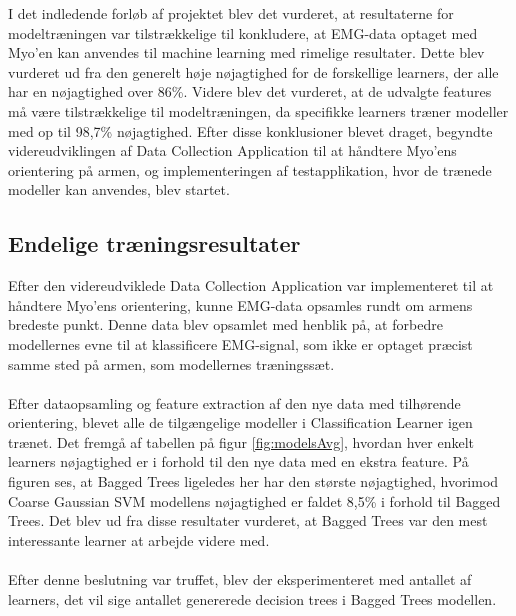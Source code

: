  I det indledende forløb af projektet blev det vurderet, at resultaterne for modeltræningen var tilstrækkelige til konkludere, at EMG-data optaget med Myo'en kan anvendes til machine learning med rimelige resultater. Dette blev vurderet ud fra den generelt høje nøjagtighed for de forskellige learners, der alle har en nøjagtighed over 86\%. Videre blev det vurderet, at de udvalgte features må være tilstrækkelige til modeltræningen, da specifikke learners træner modeller med op til 98,7\% nøjagtighed. Efter disse konklusioner blevet draget, begyndte videreudviklingen af Data Collection Application til at håndtere Myo'ens orientering på armen, og implementeringen af testapplikation, hvor de trænede modeller kan anvendes, blev startet.

 \subsection{Endelige træningsresultater}
 Efter den videreudviklede Data Collection Application var implementeret til at håndtere Myo'ens orientering, kunne EMG-data opsamles rundt om armens bredeste punkt. Denne data blev opsamlet med henblik på, at forbedre modellernes evne til at klassificere EMG-signal, som ikke er optaget præcist samme sted på armen, som modellernes træningssæt.\\\\
 Efter dataopsamling og feature extraction af den nye data med tilhørende orientering, blevet alle de tilgængelige modeller i Classification Learner igen trænet. Det fremgå af tabellen på figur \ref{fig:modelsAvg}, hvordan hver enkelt learners nøjagtighed er i forhold til den nye data med en ekstra feature. På figuren ses, at Bagged Trees ligeledes her har den største nøjagtighed, hvorimod Coarse Gaussian SVM modellens nøjagtighed er faldet 8,5\% i forhold til Bagged Trees. Det blev ud fra disse resultater vurderet, at Bagged Trees var den mest interessante learner at arbejde videre med.
 \\\\ 
Efter denne beslutning var truffet, blev der eksperimenteret med antallet af learners, det vil sige antallet genererede decision trees i Bagged Trees modellen.

